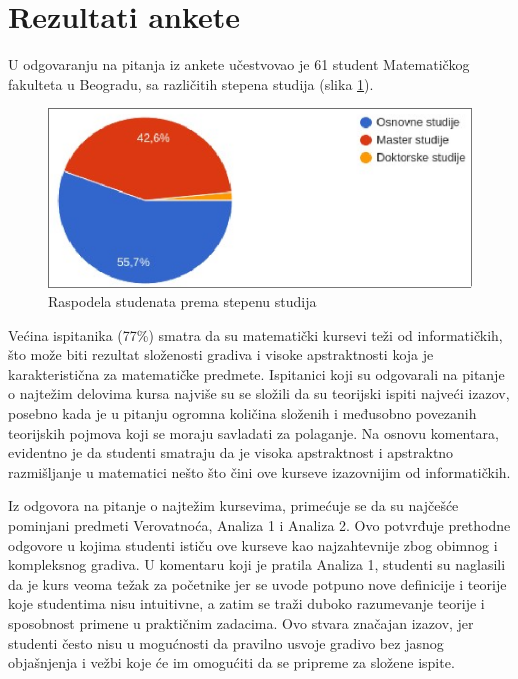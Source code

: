 \documentclass[a4paper]{article}
\begin{document}
\section{Rezultati ankete}

U odgovaranju na pitanja iz ankete učestvovao je 61 student
Matematičkog fakulteta u Beogradu, sa različitih stepena studija (slika \ref{fig:stepen_studija}).

\begin{figure}[h!]
\begin{center}
\includegraphics[scale=0.35]{stepen_studija_pie.png}
\end{center}
\caption{Raspodela studenata prema stepenu studija}
\label{fig:stepen_studija}
\end{figure}

Većina ispitanika (77\%) smatra da su matematički kursevi teži od informatičkih, što može biti rezultat složenosti gradiva i visoke apstraktnosti koja je karakteristična za matematičke predmete. Ispitanici koji su odgovarali na pitanje o najtežim delovima kursa najviše su se složili da su teorijski ispiti najveći izazov, posebno kada je u pitanju ogromna količina složenih i međusobno povezanih teorijskih pojmova koji se moraju savladati za polaganje. Na osnovu komentara, evidentno je da studenti smatraju da je visoka apstraktnost i apstraktno razmišljanje u matematici nešto što čini ove kurseve izazovnijim od informatičkih.

Iz odgovora na pitanje o najtežim kursevima, primećuje se da su najčešće pominjani predmeti Verovatnoća, Analiza 1 i Analiza 2. Ovo potvrđuje prethodne odgovore u kojima studenti ističu ove kurseve kao najzahtevnije zbog obimnog i kompleksnog gradiva. U komentaru koji je pratila Analiza 1, studenti su naglasili da je kurs veoma težak za početnike jer se uvode potpuno nove definicije i teorije koje studentima nisu intuitivne, a zatim se traži duboko razumevanje teorije i sposobnost primene u praktičnim zadacima. Ovo stvara značajan izazov, jer studenti često nisu u mogućnosti da pravilno usvoje gradivo bez jasnog objašnjenja i vežbi koje će im omogućiti da se pripreme za složene ispite.
\end{document}
